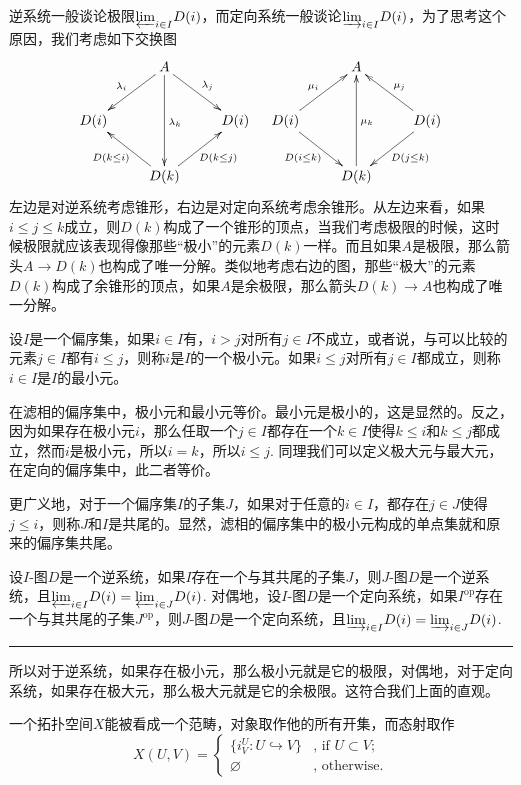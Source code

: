 逆系统一般谈论极限${\varprojlim}_{i\in I} D(i)$，而定向系统一般谈论${\varinjlim}_{i\in I} D(i)$，为了思考这个原因，我们考虑如下交换图
\[
	\xymatrix{
		&A \ar[dl]_{\lambda_{i}}\ar[dr]^{\lambda_{j}}\ar[dd]^{\lambda_{k}}&\\
		D(i)&&D(i)\\
		&D(k)\ar[ul]^{D(k\leq i)}\ar[ur]_{D(k\leq j)}&
	}
	\quad
	\xymatrix{
		&A &\\
		\ar[ur]^{\mu_{i}}D(i)\ar[dr]_{D(i\leq k)}&&D(i)\ar[ul]_{\mu_{j}}\ar[dl]^{D(j\leq k)}\\
		&D(k)\ar[uu]_{\mu_{k}}&
	}
\]
左边是对逆系统考虑锥形，右边是对定向系统考虑余锥形。从左边来看，如果$i\leq j\leq k$成立，则$D(k)$构成了一个锥形的顶点，当我们考虑极限的时候，这时候极限就应该表现得像那些“极小”的元素$D(k)$一样。而且如果$A$是极限，那么箭头$A\to D(k)$也构成了唯一分解。类似地考虑右边的图，那些“极大”的元素$D(k)$构成了余锥形的顶点，如果$A$是余极限，那么箭头$D(k)\to A$也构成了唯一分解。

\para 设$I$是一个偏序集，如果$i\in I$有，$i>j$对所有$j\in I$不成立，或者说，与可以比较的元素$j\in I$都有$i\leq j$，则称$i$是$I$的一个极小元。如果$i\leq j$对所有$j\in I$都成立，则称$i\in I$是$I$的最小元。

在滤相的偏序集中，极小元和最小元等价。最小元是极小的，这是显然的。反之，因为如果存在极小元$i$，那么任取一个$j\in I$都存在一个$k\in I$使得$k\leq i$和$k\leq j$都成立，然而$i$是极小元，所以$i=k$，所以$i\leq j$. 同理我们可以定义极大元与最大元，在定向的偏序集中，此二者等价。

更广义地，对于一个偏序集$I$的子集$J$，如果对于任意的$i\in I$，都存在$j\in J$使得$j\leq i$，则称$J$和$I$是共尾的。显然，滤相的偏序集中的极小元构成的单点集就和原来的偏序集共尾。

\pro 设$I$-图$D$是一个逆系统，如果$I$存在一个与其共尾的子集$J$，则$J$-图$D$是一个逆系统，且${\varprojlim}_{i\in I} D(i)={\varprojlim}_{i\in J} D(i)$. 对偶地，设$I$-图$D$是一个定向系统，如果$I^{\mathrm{op}} $存在一个与其共尾的子集$J^{\mathrm{op}} $，则$J$-图$D$是一个定向系统，且${\varinjlim}_{i\in I} D(i)={\varinjlim}_{i\in J} D(i)$. \rule{2mm}{2mm}

所以对于逆系统，如果存在极小元，那么极小元就是它的极限，对偶地，对于定向系统，如果存在极大元，那么极大元就是它的余极限。这符合我们上面的直观。

\para 一个拓扑空间$X$能被看成一个范畴，对象取作他的所有开集，而态射取作
\[
	{X}(U,V)=\begin{cases}
	\bigl\{i^U_V:U\hookrightarrow V\bigr\}&\text{, if }U\subset V\text{;}\\
	\varnothing&\text{, otherwise}.
	\end{cases}
\]

